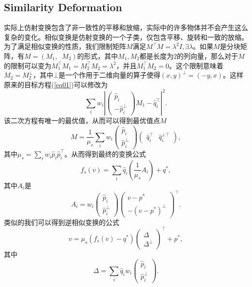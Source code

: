 \documentclass[12pt]{article}
\begin{document}
\subsection{Similarity Deformation}
实际上仿射变换包含了非一致性的平移和放缩，实际中的许多物体并不会产生这么复杂的变化。相似变换是仿射变换的一个子类，仅包含平移、旋转和一致的放缩。为了满足相似变换的性质，我们限制矩阵$M$满足$M^{\top}M=\lambda^2I, \exists\lambda$。如果$M$是分块矩阵，有$M=(M_1,\;\;M_2)$的形式，其中$M_1, M_2$都是长度为$2$的列向量，那么对于$M$的限制可以变为$M_1^{\top}M_1=M_2^{\top}M_2=\lambda^2$，并且$M_1^{\top}M_2=0$。这个限制意味着$M_2=M_2^{\bot}$，其中$\bot$是一个作用于二维向量的算子使得$(x, y)^{\bot}=(-y, x)$。这样原来的目标方程(\ref{eq01})可以修改为
\begin{equation}
	\sum_i w_i\left|\left(\begin{matrix}
	\hat{p}_i \\ -\hat{p}_i^{\bot}
	\end{matrix}\right)M_1-\hat{q}_i^{\top}\right|^2.
\end{equation}
该二次方程有唯一的最优值，从而可以得到最优值点$M$
\begin{equation}\label{eq02}
	M = \frac{1}{\mu_s}\sum_i w_i\left(\begin{matrix}
	\hat{p}_i \\ \hat{p}_i^{\bot}
	\end{matrix}\right)\left(\begin{matrix}
	\hat{q}_i^{\top} & \hat{q}_i^{\bot\top}
	\end{matrix}\right),
\end{equation}
其中$\mu_s=\sum_i w_i\hat{p}_i\hat{p}_i^{\top}$。从而得到最终的变换公式
\begin{equation*}
	f_s(v) = \sum_i\hat{q}_i\left(\frac{1}{\mu_s}A_i\right)+q^*,
\end{equation*}
其中$A_i$是
\begin{equation}\label{eq03}
	A_i = w_i\left(\begin{matrix}
	\hat{p}_i \\ \hat{p}_i^{\bot}
	\end{matrix}\right)\left(\begin{matrix}
	v-p^* \\ -(v-p^*)^{\bot}
	\end{matrix}\right)^{\top}.
\end{equation}
类似的我们可以得到逆相似变换的公式
\begin{equation}
	v = \mu_s(f_s(v) - q^*)\left(\begin{matrix}
	\Delta \\ \Delta^{\bot}
	\end{matrix}\right)^{\top} + p^*,
\end{equation}
其中
$$
\Delta=\sum_i\hat{q}_iw_i\left(\begin{matrix}\hat{p}_i\\\hat{p}_i^{\bot}\end{matrix}\right).
$$
\end{document}
